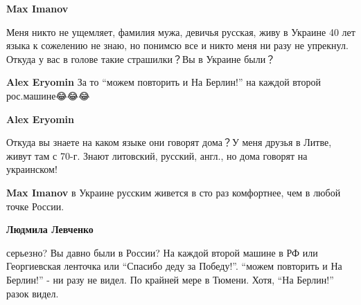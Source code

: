 \begin{itemize}
\begin{itemize}
 
\textbf{Max Imanov} 

Меня никто не ущемляет, фамилия мужа, девичья русская, живу в Украине 40 лет языка
к сожелению не знаю, но понимсю все и никто меня ни разу не упрекнул. Откуда у
вас в голове такие страшилки？Вы в Украине были？


 
\textbf{Alex Eryomin} За то \enquote{можем повторить и На Берлин!} на каждой второй рос.машине😂😂😂

 
\textbf{Alex Eryomin} 

Откуда вы знаете на каком языке они говорят дома？У меня друзья в Литве, живут
там с 70-г. Знают литовский, русский, англ., но дома говорят на украинском!

 
\textbf{Max Imanov} в Украине русским живется в сто раз комфортнее, чем в любой точке России.

 
\textbf{Людмила Левченко} 

серьезно? Вы давно были в России? На каждой второй машине в РФ или Георгиевская
ленточка или \enquote{Спасибо деду за Победу!}. \enquote{можем повторить и На Берлин!} - ни
разу не видел. По крайней мере в Тюмени. Хотя, \enquote{На Берлин!} разок видел.


 

\end{itemize}
\end{itemize}
